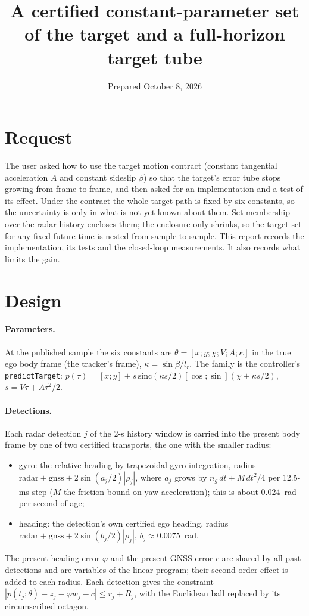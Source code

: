 \documentclass[11pt]{article}
\title{A certified constant-parameter set of the target and a full-horizon target tube}
\date{Prepared October 8, 2026}
\begin{document}
\maketitle

\section{Request}
The user asked how to use the target motion contract (constant tangential
acceleration $A$ and constant sideslip $\beta$) so that the target's error
tube stops growing from frame to frame, and then asked for an implementation
and a test of its effect. Under the contract the whole target path is fixed by
six constants, so the uncertainty is only in what is not yet known about them.
Set membership over the radar history encloses them; the enclosure only
shrinks, so the target set for any fixed future time is nested from sample to
sample. This report records the implementation, its tests and the closed-loop
measurements. It also records what limits the gain.

\section{Design}
\paragraph{Parameters.} At the published sample the six constants are
$\theta=[x;y;\chi;V;A;\kappa]$ in the true ego body frame (the tracker's
frame), $\kappa=\sin\beta/l_r$. The family is the controller's
\texttt{predictTarget}: $p(\tau)=[x;y]+s\,\mathrm{sinc}(\kappa s/2)
[\cos;\sin](\chi+\kappa s/2)$, $s=V\tau+A\tau^2/2$.

\paragraph{Detections.} Each radar detection $j$ of the 2-s history window is
carried into the present body frame by one of two certified transports, the
one with the smaller radius:
\begin{itemize}
\item gyro: the relative heading by trapezoidal gyro integration, radius
  $\mathrm{radar}+\mathrm{gnss}+2\sin(a_j/2)|\rho_j|$, where $a_j$ grows by
  $n_g\,dt+M\,dt^2/4$ per 12.5-ms step ($M$ the friction bound on yaw
  acceleration); this is about 0.024~rad per second of age;
\item heading: the detection's own certified ego heading, radius
  $\mathrm{radar}+\mathrm{gnss}+2\sin(b_j/2)|\rho_j|$, $b_j\approx0.0075$~rad.
\end{itemize}
The present heading error $\varphi$ and the present GNSS error $c$ are shared
by all past detections and are variables of the linear program; their
second-order effect is added to each radius. Each detection gives the
constraint $|p(t_j;\theta)-z_j-\varphi w_j-c|\le r_j+R_j$, with the Euclidean
ball replaced by its circumscribed octagon.
\end{document}

